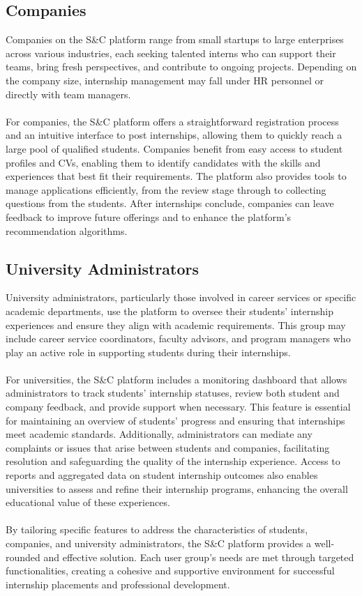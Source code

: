 \subsection{Companies}
Companies on the S\&C platform range from small startups to large enterprises across various industries, each seeking talented interns who can support their teams, bring fresh perspectives, and contribute to ongoing projects. Depending on the company size, internship management may fall under HR personnel or directly with team managers. \\ \\
For companies, the S\&C platform offers a straightforward registration process and an intuitive interface to post internships, allowing them to quickly reach a large pool of qualified students. Companies benefit from easy access to student profiles and CVs, enabling them to identify candidates with the skills and experiences that best fit their requirements. The platform also provides tools to manage applications efficiently, from the review stage through to collecting questions from the students. After internships conclude, companies can leave feedback to improve future offerings and to enhance the platform’s recommendation algorithms.

\subsection{University Administrators}
University administrators, particularly those involved in career services or specific academic departments, use the platform to oversee their students’ internship experiences and ensure they align with academic requirements. This group may include career service coordinators, faculty advisors, and program managers who play an active role in supporting students during their internships.\\ \\
For universities, the S\&C platform includes a monitoring dashboard that allows administrators to track students’ internship statuses, review both student and company feedback, and provide support when necessary. This feature is essential for maintaining an overview of students’ progress and ensuring that internships meet academic standards. Additionally, administrators can mediate any complaints or issues that arise between students and companies, facilitating resolution and safeguarding the quality of the internship experience. Access to reports and aggregated data on student internship outcomes also enables universities to assess and refine their internship programs, enhancing the overall educational value of these experiences.
\\ \\
By tailoring specific features to address the characteristics of students, companies, and university administrators, the S\&C platform provides a well-rounded and effective solution. Each user group’s needs are met through targeted functionalities, creating a cohesive and supportive environment for successful internship placements and professional development.



